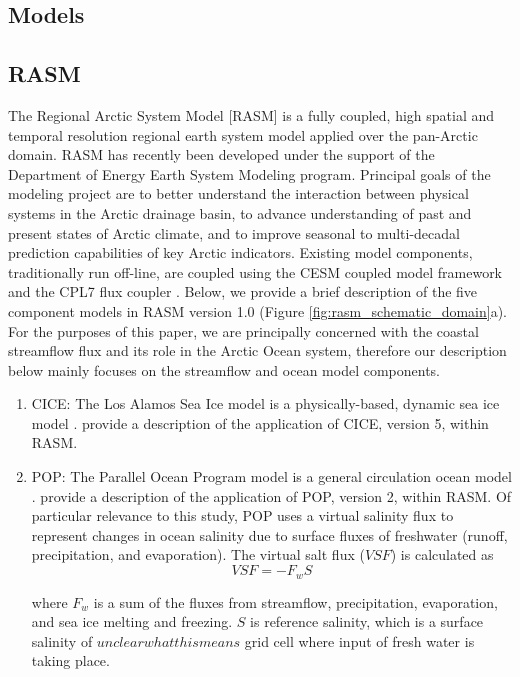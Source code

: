 \documentclass[jgrga, draft]{agutex}
\begin{document}
\begin{article}
\section{Models}
\label{sec:models}

\subsection{RASM}
\label{sec:rasm}
The Regional Arctic System Model [RASM] is a fully coupled, high spatial and temporal resolution regional earth system model applied over the pan-Arctic domain.
RASM has recently been developed under the support of the Department of Energy Earth System Modeling program.
Principal goals of the modeling project are to better understand the interaction between physical systems in the Arctic drainage basin, to advance understanding of past and present states of Arctic climate, and to improve seasonal to multi-decadal prediction capabilities of key Arctic indicators.
Existing model components, traditionally run off-line, are coupled using the CESM coupled model framework and the CPL7 flux coupler \citep{Craig_2011}.
Below, we provide a brief description of the five component models in RASM version 1.0 (Figure \ref{fig:rasm_schematic_domain}a).
For the purposes of this paper, we are principally concerned with the coastal streamflow flux and its role in the Arctic Ocean system, therefore our description below mainly focuses on the streamflow and ocean model components.
\begin{enumerate}
\item CICE: The Los Alamos Sea Ice model is a physically-based, dynamic sea ice model \citep{Hunke_2010}.
\citet{Roberts_2015a} provide a description of the application of CICE, version 5, within RASM.
\item POP: The Parallel Ocean Program model is a general circulation ocean model \citep{Smith_2010}.
\citet{Roberts_2015a} provide a description of the application of POP, version 2, within RASM.
Of particular relevance to this study, POP uses a virtual salinity flux to represent changes in ocean salinity due to surface fluxes of freshwater (runoff, precipitation, and evaporation).
The virtual salt flux ($VSF$) is calculated as
\begin{equation}
  \label{eq:SaltFlux}
  VSF= -F_w S
\end{equation}

where $F_w$ is a sum of the fluxes from streamflow, precipitation, evaporation, and sea ice melting and freezing. $S$ is reference salinity, which is a surface salinity of $unclear what this means$ grid cell where input of fresh water is taking place.


\end{enumerate}
\end{article}
\end{document}
